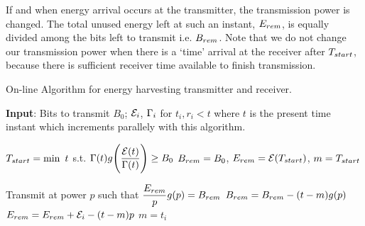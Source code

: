 If and when energy arrival occurs at the transmitter, the transmission power is changed. The total unused energy left at such an instant, $E_{\mbox{\scriptsize{rem}}}$, is equally divided among the bits left to transmit i.e. $B_{\mbox{\scriptsize{rem}}}$. Note that we do not change our transmission power when there is a `time' arrival at the receiver after $T_{\mbox{\scriptsize{start}}}$, because there is sufficient receiver time available to finish transmission.
\begin{algorithm}
\caption {On-line Algorithm for energy harvesting transmitter and receiver.}
\footnotesize
\label{algo_online}
\begin{algorithmic}[1]
\State \textbf{Input}: Bits to transmit $B_0$; $\mathcal{E}_i$, $\Gamma_i$ for $t_i,r_i<t$ where $t$ is the present time instant which increments parallely with this algorithm. 

\State $T_{\mbox{\scriptsize{start}}}=\min\ t$ s.t. $\Gamma(t)g\Bigg{(} \dfrac{\mathcal{E}(t)}{\Gamma(t)}\Bigg{)}\ge B_0$
\State $B_{\mbox{\scriptsize{rem}}}=B_0$, $E_{\mbox{\scriptsize{rem}}}=\ETx(T_{\mbox{\scriptsize{start}}})$, $m=T_{\mbox{\scriptsize{start}}}$

\Do
	\State Transmit at power $p$ such that $\dfrac{E_{\mbox{\scriptsize{rem}}}}{p} g(p)= B_{\mbox{\scriptsize{rem}}}$
		\State $B_{\mbox{\scriptsize{rem}}}=B_{\mbox{\scriptsize{rem}}}-(t-m)g(p)$
		\State $E_{\mbox{\scriptsize{rem}}}=E_{\mbox{\scriptsize{rem}}}+\ETx_i-(t-m)p$
		\State $m=t_i$
	\EndIf
{}
\end{algorithmic}
\end{algorithm}

